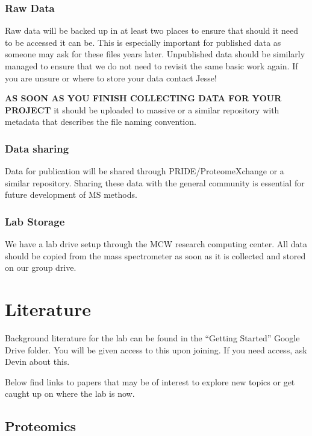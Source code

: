 \documentclass[
]{book}
\begin{document}
\hypertarget{raw-data}{%
\subsection{Raw Data}\label{raw-data}}

Raw data will be backed up in at least two places to ensure that should it need to be accessed it can be. This is especially important for published data as someone may ask for these files years later. Unpublished data should be similarly managed to ensure that we do not need to revisit the same basic work again. If you are unsure or where to store your data contact Jesse!

\textbf{AS SOON AS YOU FINISH COLLECTING DATA FOR YOUR PROJECT} it should be uploaded to massive or a similar repository with metadata that describes the file naming convention.

\hypertarget{data-sharing}{%
\subsection{Data sharing}\label{data-sharing}}

Data for publication will be shared through PRIDE/ProteomeXchange or a similar repository. Sharing these data with the general community is essential for future development of MS methods.

\hypertarget{lab-storage}{%
\subsection{Lab Storage}\label{lab-storage}}

We have a lab drive setup through the MCW research computing center. All data should be copied from the mass spectrometer as soon as it is collected and stored on our group drive.

\hypertarget{literature}{%
\chapter{Literature}\label{literature}}

Background literature for the lab can be found in the ``Getting Started'' Google Drive folder. You will be given access to this upon joining. If you need access, ask Devin about this.

Below find links to papers that may be of interest to explore new topics or get caught up on where the lab is now.

\hypertarget{proteomics}{%
\section{Proteomics}\label{proteomics}}
\end{document}
